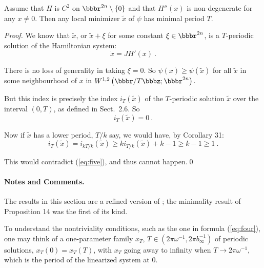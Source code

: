 \begin{lemma}
Assume that $H$ is $C^{2}$ on $\bbbr^{2n} \setminus \{ 0\}$ and
that $H'' (x)$ is non-de\-gen\-er\-ate for any $x\ne 0$. Then any local
minimizer $\widetilde{x}$ of $\psi$ has minimal period $T$.
\end{lemma}
%
\begin{proof}
We know that $\widetilde{x}$, or
$\widetilde{x} + \xi$ for some constant $\xi
\in \bbbr^{2n}$, is a $T$-periodic solution of the Hamiltonian system:
\begin{equation}
  \dot{x} = JH' (x)\ .
\end{equation}

There is no loss of generality in taking $\xi = 0$. So
$\psi (x) \ge \psi (\widetilde{x} )$
for all $\widetilde{x}$ in some neighbourhood of $x$ in
$W^{1,2} \left(\bbbr / T\bbbz ; \bbbr^{2n}\right)$.

But this index is precisely the index
$i_{T} (\widetilde{x} )$ of the $T$-periodic
solution $\widetilde{x}$ over the interval
$(0,T)$, as defined in Sect.~2.6. So
\begin{equation}
  i_{T} (\widetilde{x} ) = 0\ .
  \label{eq:five}
\end{equation}

Now if $\widetilde{x}$ has a lower period, $T/k$ say,
we would have, by Corollary 31:
\begin{equation}
  i_{T} (\widetilde{x} ) =
  i_{kT/k}(\widetilde{x} ) \ge
  ki_{T/k} (\widetilde{x} ) + k-1 \ge k-1 \ge 1\ .
\end{equation}

This would contradict (\ref{eq:five}), and thus cannot happen.\qed
\end{proof}
%
\paragraph{Notes and Comments.}
The results in this section are a
refined version of \cite{clar:eke};
the minimality result of Proposition
14 was the first of its kind.

To understand the nontriviality conditions, such as the one in formula
(\ref{eq:four}), one may think of a one-parameter family
$x_{T}$, $T\in \left(2\pi\omega^{-1}, 2\pi b_{\infty}^{-1}\right)$
of periodic solutions, $x_{T} (0) = x_{T} (T)$,
with $x_{T}$ going away to infinity when $T\to 2\pi \omega^{-1}$,
which is the period of the linearized system at 0.

